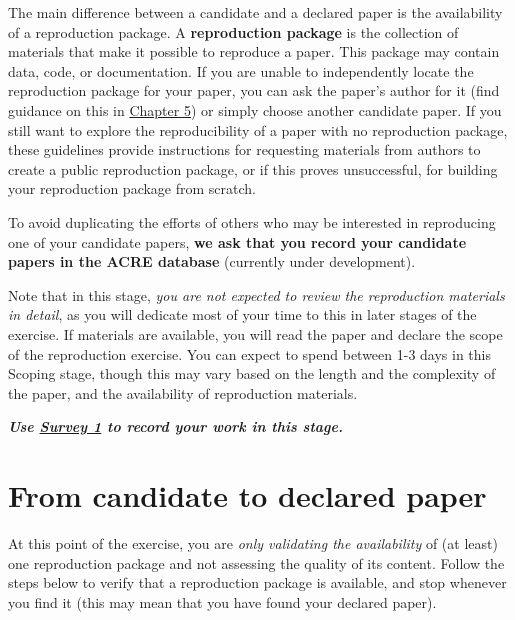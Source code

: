 \documentclass[]{book}
\begin{document}
The main difference between a candidate and a declared paper is the availability of a reproduction package. A \textbf{reproduction package} is the collection of materials that make it possible to reproduce a paper. This package may contain data, code, or documentation. If you are unable to independently locate the reproduction package for your paper, you can ask the paper's author for it (find guidance on this in \href{https://bitss.github.io/ACRE/guidance-for-a-constructive-exchange-between-reproducers-and-original-authors.html}{Chapter 5}) or simply choose another candidate paper. If you still want to explore the reproducibility of a paper with no reproduction package, these guidelines provide instructions for requesting materials from authors to create a public reproduction package, or if this proves unsuccessful, for building your reproduction package from scratch.

To avoid duplicating the efforts of others who may be interested in reproducing one of your candidate papers, \textbf{we ask that you record your candidate papers in the ACRE database} (currently under development).

Note that in this stage, \emph{you are not expected to review the reproduction materials in detail}, as you will dedicate most of your time to this in later stages of the exercise. If materials are available, you will read the paper and declare the scope of the reproduction exercise. You can expect to spend between 1-3 days in this Scoping stage, though this may vary based on the length and the complexity of the paper, and the availability of reproduction materials.

\textbf{\emph{Use \href{https://berkeley.qualtrics.com/jfe/form/SV_2bO83uJvU9ZiTXv}{Survey 1} to record your work in this stage.}}

\hypertarget{declare}{%
\section{From candidate to declared paper}\label{declare}}

At this point of the exercise, you are \emph{only validating the availability} of (at least) one reproduction package and not assessing the quality of its content. Follow the steps below to verify that a reproduction package is available, and stop whenever you find it (this may mean that you have found your declared paper).
\end{document}
